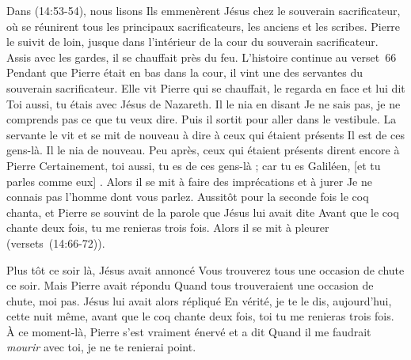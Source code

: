 Dans (14:53-54), nous lisons\frcolon{}
 \Og Ils emmenèrent Jésus chez le souverain sacrificateur,
 où se réunirent tous les principaux sacrificateurs,
 les anciens et les scribes.
 Pierre le suivit de loin, jusque dans l'intérieur de la cour
 du souverain sacrificateur.
 Assis avec les gardes, il se chauffait près du feu. \Fg{}
 L'histoire continue au verset~66\frcolon{}
 \Og Pendant que Pierre était en bas dans la cour,
 il vint une des servantes du souverain sacrificateur.
 Elle vit Pierre qui se chauffait, le regarda en face et lui dit\frcolon{}
 Toi aussi, tu étais avec Jésus de Nazareth. Il le nia en disant\frcolon{}
 Je ne sais pas, je ne comprends pas ce que tu veux dire.
 Puis il sortit pour aller dans le vestibule.
 La servante le vit et se mit de nouveau à dire
 à ceux qui étaient présents\frcolon{} Il est de ces \mbox{gens-là}.
 Il le nia de nouveau. Peu après, ceux qui étaient présents
 dirent encore à Pierre\frcolon{} Certainement, toi aussi,
 tu es de ces gens-là ; car tu es Galiléen, [et tu parles comme eux] .
 Alors il se mit à faire des imprécations et à jurer\frcolon{}
 Je ne connais pas l'homme dont vous parlez. Aussitôt pour la seconde fois
 le coq chanta, et Pierre se souvint de la parole que Jésus lui avait dite\frcolon{}
 Avant que le coq chante deux fois, tu me renieras trois fois.
 Alors il se mit à pleurer \Fg{} (versets~(14:66-72)).

Plus tôt ce soir là, Jésus avait annoncé\frcolon{}
 \Og Vous trouverez tous une occasion de chute ce soir. \Fg{}
 Mais Pierre avait répondu\frcolon{}
 \Og Quand tous trouveraient une occasion de chute, moi pas. \Fg{}
 Jésus lui avait alors répliqué\frcolon{}
 \Og En vérité, je te le dis, aujourd'hui, cette nuit même,
 avant que le coq chante deux fois, toi tu me renieras trois fois. \Fg{}
 À ce moment-là, Pierre s'est vraiment énervé et a dit\frcolon{}
 \Og Quand il me faudrait \emph{mourir} avec toi, je ne te renierai point. \Fg{}

